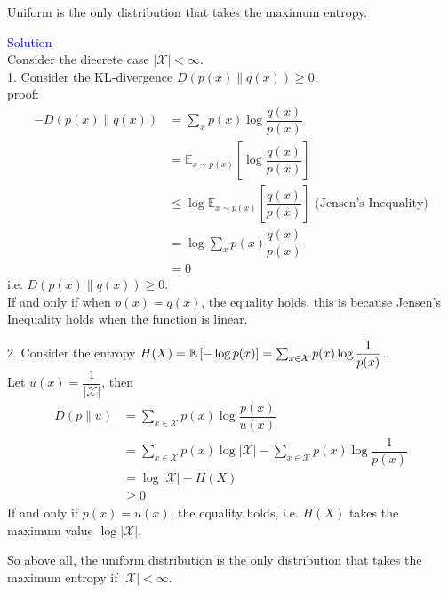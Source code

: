 \begin{homeworkProblem}
Uniform is the only distribution that takes the maximum entropy.

\textcolor{blue}{Solution} \\

Consider the diecrete case $|\mathcal{X}|<\infty$. \\

1. Consider the KL-divergence $D\left(p(x)\|q(x)\right)\geq 0$.\\
proof:
\begin{align*}
-D\left(p(x)\|q(x)\right) &= \sum_{x}p(x)\log\dfrac{q(x)}{p(x)} \\
&= \mathbb{E}_{x\sim p(x)}\left[\log\dfrac{q(x)}{p(x)}\right] \\
&\leq \log\mathbb{E}_{x\sim p(x)}\left[\dfrac{q(x)}{p(x)}\right] \text{\ \ \ \ (Jensen's Inequality)} \\
&= \log\sum_{x}p(x)\dfrac{q(x)}{p(x)} \\
&= 0
\end{align*}
i.e. $D\left(p(x)\|q(x)\right)\geq 0$. \\
If and only if when $p(x)=q(x)$, the equality holds, this is because Jensen's Inequality holds when the function is linear.

2. Consider the entropy $H(X)=\mathbb{E}\left[-\log p(x)\right]=\sum_{x\in\mathcal{X}}p(x)\log\dfrac{1}{p(x)}$. \\
Let $u(x)=\dfrac{1}{|\mathcal{X}|}$, then
\begin{align*}
D\left(p\|u\right) &= \sum_{x\in\mathcal{X}}p(x)\log\dfrac{p(x)}{u(x)} \\
&= \sum_{x\in\mathcal{X}}p(x)\log|\mathcal{X}| - \sum_{x\in\mathcal{X}}p(x)\log\dfrac{1}{p(x)} \\
&= \log|\mathcal{X}| - H(X) \\
&\geq 0
\end{align*}
If and only if $p(x)=u(x)$, the equality holds, i.e. $H(X)$ takes the maximum value $\log|\mathcal{X}|$.

So above all, the uniform distribution is the only distribution that takes the maximum entropy if $|\mathcal{X}|<\infty$.

\end{homeworkProblem}